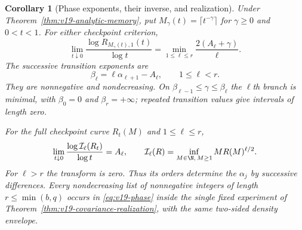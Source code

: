 \documentclass[11pt]{amsart}
\newtheorem{corollary}[theorem]{Corollary}
\theoremstyle{definition}\newtheorem{definition}[theorem]{Definition}
\theoremstyle{remark}\newtheorem{remark}[theorem]{Remark}
\begin{document}
\begin{corollary}[Phase exponents, their inverse, and realization]
\label{cor:v19-memory-phases}
Under Theorem~\ref{thm:v19-analytic-memory}, put
$M_\gamma(t)=\lceil t^{-\gamma}\rceil$ for $\gamma\ge0$ and
$0<t<1$. For either checkpoint criterion,
\begin{equation}\label{eq:v19-phase}
 \lim_{t\downarrow0}\frac{\log R_{M_\gamma(t),1}(t)}{\log t}
 =\min_{1\le\ell\le r}\frac{2(A_\ell+\gamma)}{\ell}.
\end{equation}
The successive transition exponents are
\begin{equation}\label{eq:v19-transitions}
 \beta_\ell=\ell\alpha_{\ell+1}-A_\ell,
       \qquad 1\le\ell<r.
\end{equation}
They are nonnegative and nondecreasing. On
$\beta_{\ell-1}\le\gamma\le\beta_\ell$ the $\ell$th branch
is minimal, with $\beta_0=0$ and $\beta_r=+\infty$;
repeated transition values give intervals of length zero.

For the full checkpoint curve $R_t(M)$ and $1\le\ell\le r$,
\begin{equation}\label{eq:v19-valuation-inverse}
 \lim_{t\downarrow0}
   \frac{\log\mathcal I_\ell(R_t)}{\log t}=A_\ell,
 \qquad \mathcal I_\ell(R)=\inf_{M\in\N,\,M\ge1}MR(M)^{\ell/2}.
\end{equation}
For $\ell>r$ the transform is zero. Thus its orders determine the
$\alpha_j$ by successive differences.
Every nondecreasing list of nonnegative integers of length
$r\le\min(b,q)$ occurs in \eqref{eq:v19-phase} inside the single
fixed experiment of Theorem~\ref{thm:v19-covariance-realization},
with the same two-sided density envelope.
\end{corollary}
\end{document}
